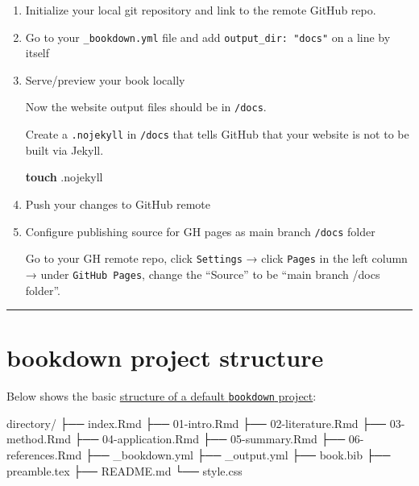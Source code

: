 \documentclass[
  a4paper,
  twoside,
  openright]{book}
\newenvironment{Shaded}{\begin{snugshade}}{\end{snugshade}}
\newcommand{\FunctionTok}[1]{\textcolor[rgb]{0.13,0.29,0.53}{\textbf{#1}}}
\newcommand{\NormalTok}[1]{#1}
\theoremstyle{definition}
\theoremstyle{definition}
\theoremstyle{definition}
\theoremstyle{definition}
\theoremstyle{remark}
\begin{document}
\begin{enumerate}
\def\labelenumi{\arabic{enumi}.}
\item
  Initialize your local git repository and link to the remote GitHub repo.
\item
  Go to your \texttt{\_bookdown.yml} file and add \texttt{output\_dir:\ "docs"} on a line by itself
\item
  Serve/preview your book locally

  Now the website output files should be in \texttt{/docs}.

  Create a \texttt{.nojekyll} in \texttt{/docs} that tells GitHub that your website is not to be built via Jekyll.

\begin{Shaded}
\begin{Highlighting}[]
\FunctionTok{touch}\NormalTok{ .nojekyll}
\end{Highlighting}
\end{Shaded}
\item
  Push your changes to GitHub remote
\item
  Configure publishing source for GH pages as main branch \texttt{/docs} folder

  Go to your GH remote repo, click \texttt{Settings} → click \texttt{Pages} in the left column → under \texttt{GitHub\ Pages}, change the ``Source'' to be ``main branch /docs folder''.
\end{enumerate}

\begin{center}\rule{0.5\linewidth}{0.5pt}\end{center}

\section{bookdown project structure}\label{bookdown-project-structure}

Below shows the basic \href{https://bookdown.org/yihui/rmarkdown/bookdown-project.html}{structure of a default \texttt{bookdown} project}:

\begin{Shaded}
\begin{Highlighting}[]
\NormalTok{directory/}
\NormalTok{├──  index.Rmd}
\NormalTok{├── 01{-}intro.Rmd}
\NormalTok{├── 02{-}literature.Rmd}
\NormalTok{├── 03{-}method.Rmd}
\NormalTok{├── 04{-}application.Rmd}
\NormalTok{├── 05{-}summary.Rmd}
\NormalTok{├── 06{-}references.Rmd}
\NormalTok{├── \_bookdown.yml}
\NormalTok{├── \_output.yml}
\NormalTok{├──  book.bib}
\NormalTok{├──  preamble.tex}
\NormalTok{├──  README.md}
\NormalTok{└──  style.css}
\end{Highlighting}
\end{Shaded}
\end{document}
